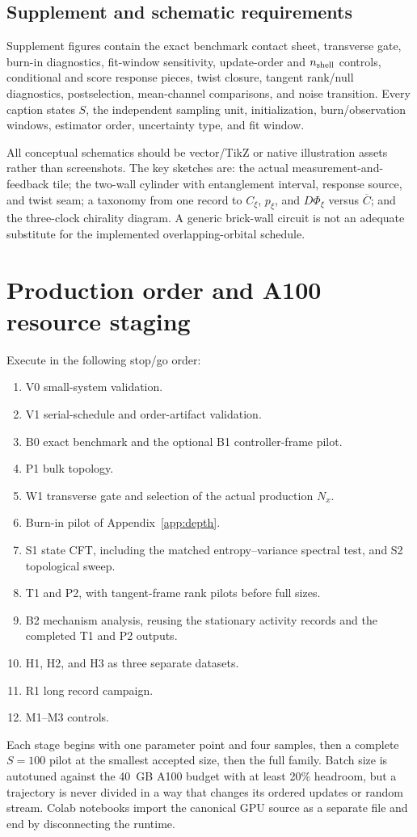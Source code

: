 \documentclass[aps,prx,onecolumn,nofootinbib,superscriptaddress,longbibliography]{revtex4-2}
\newcommand{\avg}[1]{\overline{#1}}
\begin{document}
\subsection{Supplement and schematic requirements}
Supplement figures contain the exact benchmark contact sheet, transverse gate, burn-in
diagnostics, fit-window sensitivity, update-order and $n_{\rm shell}$ controls, conditional
and score response pieces, twist closure, tangent rank/null diagnostics, postselection,
mean-channel comparisons, and noise transition.  Every caption states $S$, the independent
sampling unit, initialization, burn/observation windows, estimator order, uncertainty type,
and fit window.

All conceptual schematics should be vector/TikZ or native illustration assets rather than
screenshots.  The key sketches are: the actual measurement-and-feedback tile; the two-wall
cylinder with entanglement interval, response source, and twist seam; a taxonomy from one
record to $C_\xi$, $p_\xi$, and $D\Phi_\xi$ versus $\avg C$; and the three-clock chirality
diagram.  A generic brick-wall circuit is not an adequate substitute for the implemented
overlapping-orbital schedule.

\section{Production order and A100 resource staging}

Execute in the following stop/go order:
\begin{enumerate}
\item V0 small-system validation.
\item V1 serial-schedule and order-artifact validation.
\item B0 exact benchmark and the optional B1 controller-frame pilot.
\item P1 bulk topology.
\item W1 transverse gate and selection of the actual production $N_x$.
\item Burn-in pilot of Appendix~\ref{app:depth}.
\item S1 state CFT, including the matched entropy--variance spectral test, and S2
topological sweep.
\item T1 and P2, with tangent-frame rank pilots before full sizes.
\item B2 mechanism analysis, reusing the stationary activity records and the completed T1
and P2 outputs.
\item H1, H2, and H3 as three separate datasets.
\item R1 long record campaign.
\item M1--M3 controls.
\end{enumerate}
Each stage begins with one parameter point and four samples, then a complete $S=100$ pilot
at the smallest accepted size, then the full family.  Batch size is autotuned against the
40~GB A100 budget with at least 20\% headroom, but a trajectory is never divided in a way
that changes its ordered updates or random stream.  Colab notebooks import the canonical
GPU source as a separate file and end by disconnecting the runtime.
\end{document}
